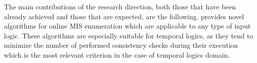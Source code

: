 \begin{minipage}{\linewidth}
\begin{multicols*}{2}
		The main contributions of the research direction, both those that
		have been already achieved and those that are expected, are the
		following. \cite{Bendik:2017:CCR:3092703.3098239} provides novel algorithms for online \gls{MIS} enumeration which are applicable to any type of input logic. These algorithms are especially suitable for temporal logics, as they tend to minimize the number of performed
		consistency checks during their execution which is the
		most relevant criterion in the case of temporal logics domain.
	\end{multicols*}
\end{minipage}

